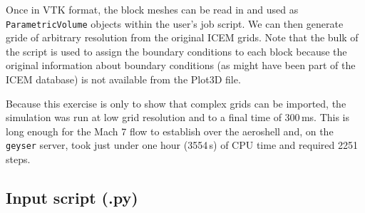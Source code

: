 \medskip
Once in VTK format, the block meshes can be read in and used as 
\texttt{ParametricVolume} objects within the user's job script.
We can then generate gride of arbitrary resolution from the original ICEM grids.
Note that the bulk of the script is used to assign the boundary conditions 
to each block because the original information about boundary conditions (as
might have been part of the ICEM database) is not available from the Plot3D file.

\medskip
Because this exercise is only to show that complex grids can be imported, the
simulation was run at low grid resolution and to a final time of 300\,ms.
This is long enough for the Mach 7 flow to establish over the aeroshell and,
on the \texttt{geyser} server, took just under one hour (3554\,s) of CPU time 
and required 2251 steps.

\bigskip
\subsection{Input script (.py)}
\topbar

\bottombar
